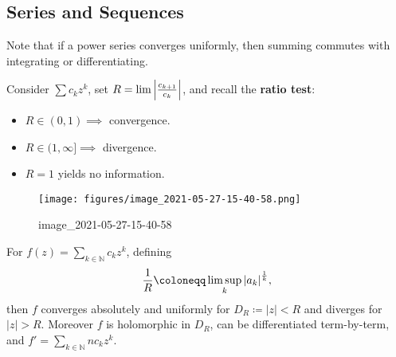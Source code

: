 \hypertarget{series-and-sequences}{%
\subsection{Series and Sequences}\label{series-and-sequences}}

\begin{remark}

Note that if a power series converges uniformly, then summing commutes
with integrating or differentiating.

\end{remark}

\begin{proposition}

Consider \(\sum c_k z^k\), set
\(R = \lim {\left\lvert {c_{k+1} \over c_k} \right\rvert}\), and recall
the \textbf{ratio test}:

\begin{itemize}
\tightlist
\item
  \(R\in (0, 1) \implies\) convergence.
\item
  \(R\in (1, \infty] \implies\) divergence.
\item
  \(R=1\) yields no information.
\end{itemize}

\end{proposition}

\begin{proposition}

\begin{figure}
\centering
\texttt{[image: figures/image\_2021-05-27-15-40-58.png]}
\caption{image\_2021-05-27-15-40-58}
\end{figure}

\end{proposition}

\begin{proposition}

For \(f(z) = \sum_{k\in {\mathbb{N}}} c_k z^k\), defining
\begin{align*}
{1\over R} \coloneqq\limsup_{k} {\left\lvert {a_k} \right\rvert}^{1\over k}
,\end{align*}
then \(f\) converges absolutely and uniformly for
\(D_R \coloneqq{\left\lvert {z} \right\rvert} < R\) and diverges for
\({\left\lvert {z} \right\rvert} > R\). Moreover \(f\) is holomorphic in
\(D_R\), can be differentiated term-by-term, and
\(f' = \sum_{k\in {\mathbb{N}}} n c_k z^k\).

\end{proposition}

